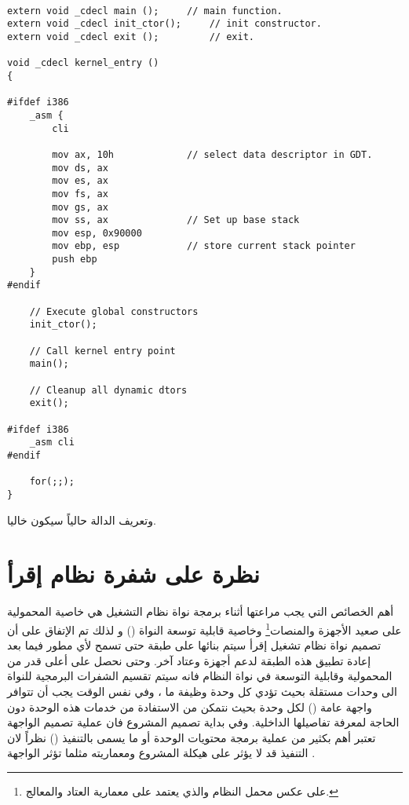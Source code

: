\documentclass[document.tex]{subfiles}
\begin{document}

\begin{english}

\lstset{numberstyle=\tiny,numbers=left,stepnumber=1,numbersep=5pt,tabsize=2,extendedchars=true,breaklines=true,frame=b,showspaces=false, showtabs=false,xleftmargin=10pt,framexleftmargin=10pt,framexrightmargin=5pt,framexbottommargin=4pt,showstringspaces=false,language=C++}

\begin{lstlisting}[label=kernel_entry_routine,caption=\en{Kernel Entry routine}]

extern void _cdecl main ();		// main function.
extern void _cdecl init_ctor();		// init constructor.
extern void _cdecl exit ();  		// exit.

void _cdecl kernel_entry ()
{

#ifdef i386
	_asm {
		cli						
		
		mov ax, 10h				// select data descriptor in GDT.
		mov ds, ax
		mov es, ax
		mov fs, ax
		mov gs, ax
		mov ss, ax				// Set up base stack
		mov esp, 0x90000
		mov ebp, esp			// store current stack pointer
		push ebp
	}
#endif

	// Execute global constructors
	init_ctor();

	// Call kernel entry point
	main();

	// Cleanup all dynamic dtors
	exit();

#ifdef i386
	_asm cli
#endif

	for(;;);
}
\end{lstlisting}
\end{english}

وتعريف الدالة  حالياً سيكون خاليا.

\section{نظرة على شفرة نظام إقرأ}
أهم الخصائص التي يجب مراعتها أثناء برمجة نواة نظام التشغيل هي خاصية المحمولية على صعيد الأجهزة والمنصات\footnote{على عكس محمل النظام  والذي يعتمد على معمارية العتاد والمعالج.} وخاصية قابلية توسعة النواة () و لذلك تم الإتفاق على أن تصميم نواة نظام تشغيل إقرأ سيتم بنائها على طبقة  حتى تسمح لأي مطور فيما بعد إعادة تطبيق هذه الطبقة لدعم أجهزة وعتاد آخر. وحتى نحصل على أعلى قدر من المحمولية وقابلية التوسعة في نواة النظام فانه سيتم تقسيم الشفرات البرمجية للنواة الى وحدات مستقلة بحيث تؤدي كل وحدة وظيفة ما ، وفي نفس الوقت يجب أن تتوافر واجهة عامة () لكل وحدة بحيث نتمكن من الاستفادة من خدمات هذه الوحدة دون الحاجة لمعرفة تفاصيلها الداخلية. وفي بداية تصميم المشروع فان عملية تصميم الواجهة تعتبر أهم بكثير من عملية برمجة محتويات الوحدة أو ما يسمى بالتنفيذ () نظراً لان التنفيذ قد لا يؤثر على هيكلة المشروع ومعماريته مثلما تؤثر الواجهة .
\end{document}
